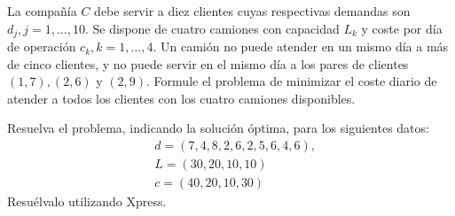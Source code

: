 \documentclass[twoside]{article}
\begin{document}
\begin{ejercicio}{3}
La compañía $C$ debe servir a diez clientes cuyas respectivas demandas son $d_j, j=1,\dots,10$. Se dispone de cuatro camiones con capacidad $L_k$ y coste por día de operación $c_k,k=1,\dots,4$. Un camión no puede atender en un mismo día a más de cinco clientes, y no puede servir en el mismo día a los pares de clientes $(1,7),(2,6)$ y $(2,9)$. Formule el problema de minimizar el coste diario de atender a todos los clientes con los cuatro camiones disponibles.

Resuelva el problema, indicando la solución óptima, para los siguientes datos:
\begin{align*}
&d=(7,4,8,2,6,2,5,6,4,6),\\
&L=(30,20,10,10)\\
&c=(40,20,10,30)
\end{align*}
Resuélvalo utilizando Xpress.
\end{ejercicio}
\end{document}
